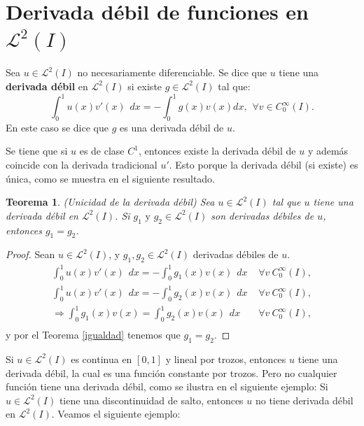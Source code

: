\documentclass[12pt,spanish,oneside]{book}
\theoremstyle{plain}
\newtheorem{teo}{Teorema}[chapter]
\numberwithin{equation}{chapter}
\theoremstyle{definition}
\theoremstyle{remark}
\newcommand{\LD}{\mathcal{L}^2}
\newcommand{\cz}{C_{\scriptscriptstyle{0}}^{\scriptscriptstyle{\infty}}}
\newcommand{\icu}{\int_0^1}
\newcommand{\dx}{\hspace{5pt} dx}
\begin{document}
\section{Derivada débil de funciones en $\LD(I)$}

Sea $ u\in \LD(I) $ no necesariamente diferenciable. Se dice que $u$ tiene una \textbf{derivada débil} en $\LD(I)$ si existe $g\in \LD(I)$ tal que:
\[\icu u(x) v'(x)\dx=-\icu g(x) v(x) dx, \hspace{5pt} \forall v \in \cz(I).\]
En este caso se dice que $g$ es una derivada débil de $u$. 

Se tiene que si $u$ es de clase $ C^1$, entonces existe la derivada débil de $u$ y además coincide con la derivada tradicional $u'$. Esto porque la derivada débil (si existe) es única, como se muestra en el siguiente resultado.

\begin{teo}{(Unicidad de la derivada débil)}
Sea $u\in \LD(I)$ tal que $u$ tiene una derivada débil en $\LD(I)$. Si $g_1 \text{ y } g_2\in \LD(I)$ son derivadas débiles de $u$, entonces $g_1=g_2$. 
\end{teo}
\begin{proof}
Sean $u\in\LD(I)$, y $ g_1,g_2\in \LD(I)$ derivadas débiles de $u$.
\begin{align*}
\icu u(x) v'(x)\dx=-\icu g_1(x) v(x)\dx & \hspace{4pt}\forall v \ \cz(I),\\
\icu u(x) v'(x)\dx=-\icu g_2(x) v(x)\dx & \hspace{4pt}\forall v \ \cz(I),\\
\Rightarrow\icu g_1(x) v(x)=\icu g_2(x) v(x)\dx &\hspace{4pt} \forall v \ \cz(I),\\
\end{align*}
y por el Teorema \ref{igualdad} tenemos que $g_1=g_2$.
\end{proof}

Si $u\in \LD(I)$ es continua en $[0,1]$ y lineal por trozos, entonces $u$ tiene una derivada débil, la cual es una función constante por trozos. Pero no cualquier función tiene una derivada débil, como se ilustra en el siguiente ejemplo:
Si $u\in \LD(I)$ tiene una discontinuidad de salto, entonces $u$ no tiene derivada débil en $\LD(I)$. Veamos el siguiente ejemplo: 
\end{document}
